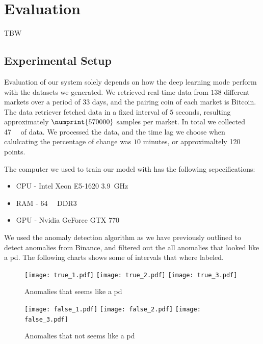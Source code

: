 
\chapter{Evaluation}\label{ch:evaluation}\glsresetall
TBW
\section{Experimental Setup}
Evaluation of our system solely depends on how the deep learning mode perform with the datasets we generated. We retrieved real-time data from $138$ different markets over a period of $33$ days, and the pairing coin of each market is Bitcoin. The data retriever fetched data in a fixed interval of $5$ seconds, resulting approximately $\numprint{570 000}$ samples per market. In total we collected \SI{47}{\giga\byte} of data. We processed the data, and the time lag we choose when calulcating the percentage of change was $10$ minutes, or approximaltely 120 points.


The computer we used to train our model with has the following scpecifications:
\begin{itemize}
    \item CPU - Intel Xeon E5-1620 \SI{3.9}{\giga\hertz}
    \item RAM - \SI{64}{\mebi\byte} DDR3 
    \item GPU - Nvidia GeForce GTX 770
\end{itemize}

We used the anomaly detection algorithm as we have previously outlined to detect anomalies from Binance, and filtered out the all anomalies that looked like a \ac{pd}. The following charts shows some of intervals that where labeled.

\begin{figure}
    \centering
    \texttt{[image: true\_1.pdf]}
    \texttt{[image: true\_2.pdf]}
    \texttt{[image: true\_3.pdf]}
    \caption{Anomalies that seems like a \ac{pd}}
    \label{fig:label_true}
\end{figure}

\begin{figure}
    \centering
    \texttt{[image: false\_1.pdf]}
    \texttt{[image: false\_2.pdf]}
    \texttt{[image: false\_3.pdf]}
    \caption{Anomalies that not seems like a \ac{pd}}
    \label{fig:label_false}
\end{figure}

